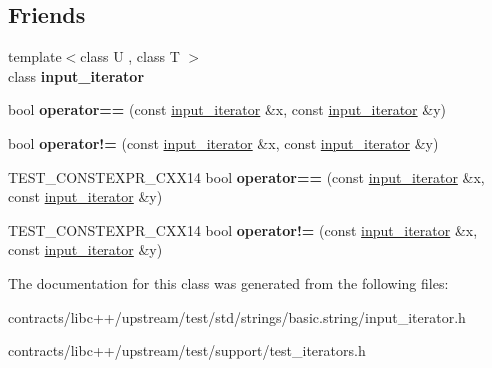 \subsection*{Friends}
\begin{DoxyCompactItemize}
\item 
\mbox{\label{classinput__iterator_a6c68597cfc9fbfb8dd551087bd57a835}} 
{\footnotesize template$<$class U , class T $>$ }\\class {\bfseries input\+\_\+iterator}
\item 
\mbox{\label{classinput__iterator_a29944b037695bb25fd8971b99cf18cb5}} 
bool {\bfseries operator==} (const \mbox{\hyperlink{classinput__iterator}{input\+\_\+iterator}} \&x, const \mbox{\hyperlink{classinput__iterator}{input\+\_\+iterator}} \&y)
\item 
\mbox{\label{classinput__iterator_acc243b7cd26edb8ba54835991ad9cd18}} 
bool {\bfseries operator!=} (const \mbox{\hyperlink{classinput__iterator}{input\+\_\+iterator}} \&x, const \mbox{\hyperlink{classinput__iterator}{input\+\_\+iterator}} \&y)
\item 
\mbox{\label{classinput__iterator_aca605adbcc00005d5a5dc1c5d02c5b7f}} 
T\+E\+S\+T\+\_\+\+C\+O\+N\+S\+T\+E\+X\+P\+R\+\_\+\+C\+X\+X14 bool {\bfseries operator==} (const \mbox{\hyperlink{classinput__iterator}{input\+\_\+iterator}} \&x, const \mbox{\hyperlink{classinput__iterator}{input\+\_\+iterator}} \&y)
\item 
\mbox{\label{classinput__iterator_a42cc0534abcd789be709f6c2cadff12e}} 
T\+E\+S\+T\+\_\+\+C\+O\+N\+S\+T\+E\+X\+P\+R\+\_\+\+C\+X\+X14 bool {\bfseries operator!=} (const \mbox{\hyperlink{classinput__iterator}{input\+\_\+iterator}} \&x, const \mbox{\hyperlink{classinput__iterator}{input\+\_\+iterator}} \&y)
\end{DoxyCompactItemize}


The documentation for this class was generated from the following files\+:\begin{DoxyCompactItemize}
\item 
contracts/libc++/upstream/test/std/strings/basic.\+string/input\+\_\+iterator.\+h\item 
contracts/libc++/upstream/test/support/test\+\_\+iterators.\+h\end{DoxyCompactItemize}
